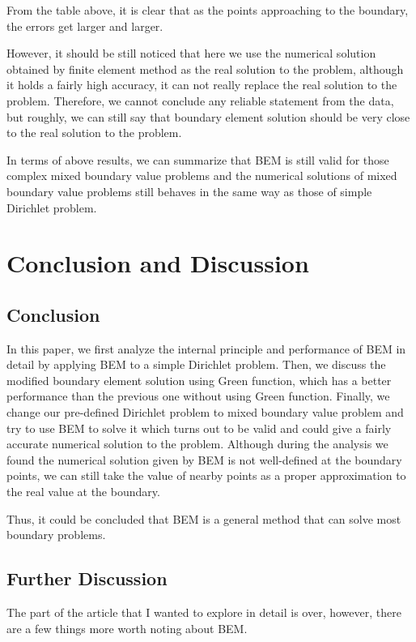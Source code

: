 \documentclass[a4paper,12pt]{article}
\begin{document}
\par From the table above, it is clear that as the points approaching to the boundary, the errors get larger and larger. 

\par However, it should be still noticed that here we use the numerical solution obtained by finite element method as the real solution to the problem, although it holds a fairly high accuracy, it can not really replace the real solution to the problem. Therefore, we cannot conclude any reliable statement from the data, but roughly, we can still say that boundary element solution should be very close to the real solution to the problem. 

\par In terms of above results, we can summarize that BEM is still valid for those complex mixed boundary value problems and the numerical solutions of mixed boundary value problems still behaves in the same way as those of simple Dirichlet problem. 
\section{Conclusion and Discussion}

\subsection{Conclusion}
In this paper, we first analyze the internal principle and performance of BEM in detail by applying BEM to a simple Dirichlet problem. Then, we discuss the modified boundary element solution using Green function, which has a better performance than the previous one without using Green function. Finally, we change our pre-defined Dirichlet problem to mixed boundary value problem and try to use BEM to solve it which turns out to be valid and could give a fairly accurate numerical solution to the problem. Although during the analysis we found the numerical solution given by BEM is not well-defined at the boundary points, we can still take the value of nearby points as a proper approximation to the real value at the boundary. 
\par Thus, it could be concluded that BEM is a general method that can solve most boundary problems.

\subsection{Further Discussion}

\par The part of the article that I wanted to explore in detail is over, however, there are a few things more worth noting about BEM. 
\end{document}
